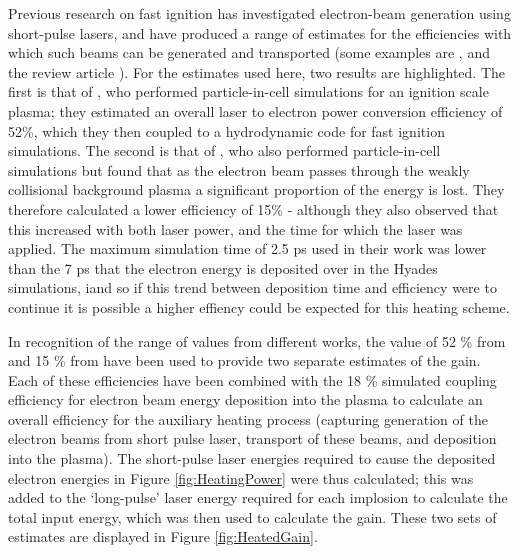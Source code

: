 Previous research on fast ignition has investigated electron-beam generation using short-pulse lasers, and have produced a range of estimates for the efficiencies with which such beams can be generated and transported (some examples are \cite{Ma2012, Kemp2014, Kemp2009}, and the review article \cite{Norreys2014}). For the estimates used here, two results are highlighted. The first is that of \cite{Strozzi2012}, who performed particle-in-cell simulations for an ignition scale plasma; they estimated an overall laser to electron power conversion efficiency of 52\%, which they then coupled to a hydrodynamic code for fast ignition simulations. The second is that of \cite{Tonge2009}, who also performed particle-in-cell simulations but found that as the electron beam passes through the weakly collisional background plasma a significant proportion of the energy is lost. They therefore calculated a lower efficiency of 15\% - although they also observed that this increased with both laser power, and the time for which the laser was applied. The maximum simulation time of 2.5 ps used in their work was lower than the 7 ps that the electron energy is deposited over in the Hyades simulations, iand so if this trend between deposition time and efficiency were to continue it is possible a higher effiency could be expected for this heating scheme.

In recognition of the range of values from different works, the value of 52 \% from \cite{Strozzi2012} and 15 \% from \cite{Tonge2009} have been used to provide two separate estimates of the gain. Each of these efficiencies have been combined with the 18 \% simulated coupling efficiency for electron beam energy deposition into the plasma to calculate an overall efficiency for the auxiliary heating process (capturing generation of the electron beams from short pulse laser, transport of these beams, and deposition into the plasma). The short-pulse laser energies required to cause the deposited electron energies in Figure \ref{fig:HeatingPower} were thus calculated; this was added to the `long-pulse' laser energy required for each implosion to calculate the total input energy, which was then used to calculate the gain. These two sets of estimates are displayed in Figure \ref{fig:HeatedGain}.

